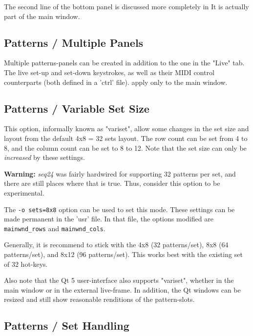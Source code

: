    The second line of the bottom panel is discussed more completely in
   It is actually part of the main window.

\subsection{Patterns / Multiple Panels}
\label{subsec:patterns_panel_multiple}

   Multiple patterns-panels can be created in addition to the one in the "Live"
   tab.  The live set-up and set-down keystrokes, as well as their MIDI control
   counterparts (both defined in a 'ctrl' file).
   apply only to the main window.

\subsection{Patterns / Variable Set Size}
\label{subsec:patterns_panel_variset}

   This option, informally known as "variset", allow some changes in
   the set size and layout from the default 4x8 = 32 sets layout.
   The row count can be set from 4 to 8, and the column count can be set to 8
   to 12.  Note that the set size can only be \textsl{increased} by these
   settings.

   \textbf{Warning:}
   \textsl{seq24} was fairly hardwired for supporting 32 patterns per
   set, and there are still places where that is true.  Thus,
   consider this option to be experimental.

   The \texttt{-o sets=8x8} option can be used to set this mode.
   These settings can be made permanent in the 'usr' file.
   In that file, the options modified are \texttt{mainwnd\_rows} and
   \texttt{mainwnd\_cols}.

   Generally, it is recommend to stick with the 4x8 (32 patterns/set),
   8x8 (64 patterns/set), and 8x12 (96 patterns/set).  This works best with the
   existing set of 32 hot-keys.

   Also note that the Qt 5 user-interface also supports "variset", whether in
   the main window or in the external live-frame.  In addition, the Qt windows
   can be resized and still show reasonable renditions of the pattern-slots.

\subsection{Patterns / Set Handling}
\label{subsec:patterns_panel_set_handling}


